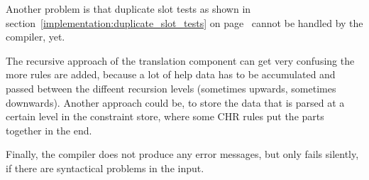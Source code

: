 Another problem is that duplicate slot tests as shown in section~\ref{implementation:duplicate_slot_tests} on page~\pageref{implementation:duplicate_slot_tests} cannot be handled by the compiler, yet.

The recursive approach of the translation component can get very confusing the more rules are added, because a lot of help data has to be accumulated and passed between the diffeent recursion levels (sometimes upwards, sometimes downwards). Another approach could be, to store the data that is parsed at a certain level in the constraint store, where some CHR rules put the parts together in the end.

Finally, the compiler does not produce any error messages, but only fails silently, if there are syntactical problems in the input.
